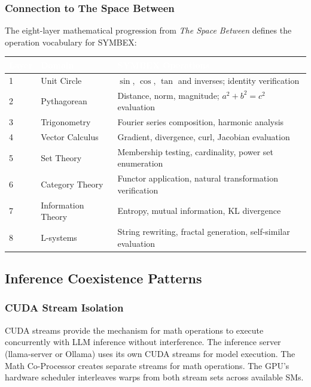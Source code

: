 \documentclass[11pt,letterpaper]{article}
\newcommand{\tableheader}[1]{\textbf{\sffamily\textcolor{white}{#1}}}
\begin{document}
\subsubsection{Connection to The Space Between}

The eight-layer mathematical progression from \textit{The Space Between} defines the operation vocabulary for SYMBEX:

\begin{center}
\begin{tabularx}{\textwidth}{C{1cm}L{3.5cm}X}
\toprule
{}
\tableheader{Layer} & \tableheader{Domain} & \tableheader{SYMBEX Operations} \\
 & Unit Circle & $\sin$, $\cos$, $\tan$ and inverses; identity verification \\
2 & Pythagorean & Distance, norm, magnitude; $a^2 + b^2 = c^2$ evaluation \\
3 & Trigonometry & Fourier series composition, harmonic analysis \\
4 & Vector Calculus & Gradient, divergence, curl, Jacobian evaluation \\
5 & Set Theory & Membership testing, cardinality, power set enumeration \\
6 & Category Theory & Functor application, natural transformation verification \\
7 & Information Theory & Entropy, mutual information, KL divergence \\
8 & L-systems & String rewriting, fractal generation, self-similar evaluation \\
\bottomrule
\end{tabularx}
\end{center}

\subsection{Inference Coexistence Patterns}

\subsubsection{CUDA Stream Isolation}

CUDA streams provide the mechanism for math operations to execute concurrently with LLM inference without interference. The inference server (llama-server or Ollama) uses its own CUDA streams for model execution. The Math Co-Processor creates separate streams for math operations. The GPU's hardware scheduler interleaves warps from both stream sets across available SMs.
\end{document}
